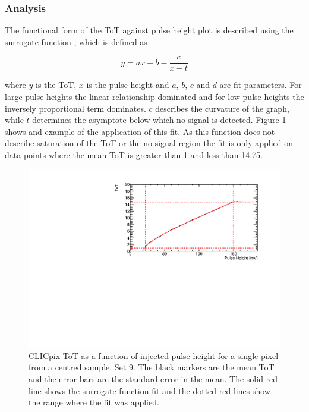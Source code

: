 
\subsubsection{Analysis}
The functional form of the ToT against pulse height plot is described using the surrogate function \cite{AlipourTehrani:2054922}, which is defined as

\begin{equation}
y  = ax + b  - \frac{c}{x-t}
\end{equation}

where $y$ is the ToT, $x$ is the pulse height and $a$, $b$, $c$ and $d$ are fit parameters.  For large pulse heights the linear relationship dominated and for low pulse heights the inversely proportional term dominates.  $c$ describes the curvature of the graph, while $t$ determines the asymptote below which no signal is detected.  Figure \ref{fig:testpulseexamplefit} shows and example of the application of this fit.  As this function does not describe saturation of the ToT or the no signal region the fit is only applied on data points where the mean ToT is greater than 1 and less than 14.75.  

\begin{figure}
\centering
\includegraphics[width=1.0\textwidth]{CLICdpVertex/Plots/TestPulseCalibration/Fits/Set9/ToT_PulseHeight_Set_9_ChipID_001ec0db94b1_Pixel_x0_y0_Fit.pdf}
\caption[CLICpix ToT as a function of injected pulse height.]{CLICpix ToT as a function of injected pulse height for a single pixel from a centred sample, Set 9.  The black markers are the mean ToT and the error bars are the standard error in the mean.  The solid red line shows the surrogate function fit and the dotted red lines show the range where the fit was applied.}
\label{fig:testpulseexamplefit}
\end{figure}

